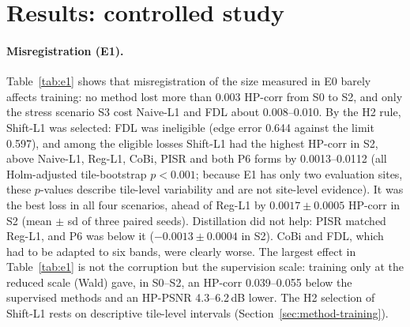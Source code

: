 \documentclass[pdflatex,sn-basic,referee,lineno]{sn-jnl}
\begin{document}
\section{Results: controlled study}\label{sec:res-controlled}

\paragraph{Misregistration (E1).} Table~\ref{tab:e1} shows that misregistration of the size measured in E0 barely
affects training: no method lost more than 0.003 HP-corr from S0 to S2, and only the stress scenario S3 cost
Naive-L1 and FDL about 0.008--0.010. By the H2 rule, Shift-L1 was selected: FDL was ineligible (edge error 0.644 against the limit 0.597), and among the
eligible losses Shift-L1 had the highest HP-corr in S2, above Naive-L1, Reg-L1, CoBi, PISR and both P6 forms by
0.0013--0.0112 (all Holm-adjusted tile-bootstrap $p<0.001$; because E1 has only two evaluation sites, these $p$-values describe
tile-level variability and are not site-level evidence). It was the best loss in
all four scenarios, ahead of Reg-L1 by $0.0017\pm0.0005$ HP-corr in S2 (mean $\pm$ sd of three paired seeds). Distillation
did not help: PISR matched Reg-L1, and P6 was below it ($-0.0013\pm0.0004$ in S2). CoBi and FDL, which had to be
adapted to six bands, were clearly worse. The largest effect in Table~\ref{tab:e1} is not the corruption but the
supervision scale: training only at the reduced scale (Wald) gave, in S0--S2, an HP-corr
0.039--0.055 below the supervised methods and an HP-PSNR 4.3--6.2\,dB lower. The H2 selection of Shift-L1 rests on
descriptive tile-level intervals (Section~\ref{sec:method-training}).
\end{document}
